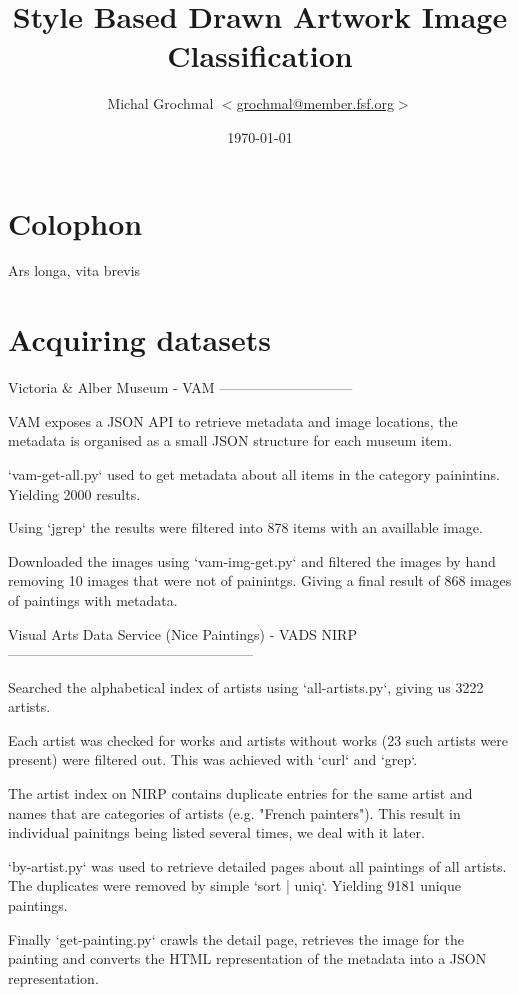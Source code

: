 \documentclass[a4paper,twocolumn]{article}
\title{Style Based Drawn Artwork Image Classification}
\author{Michal Grochmal
  $<$\href{mailto:grochmal@member.fsf.org}{grochmal@member.fsf.org}$>$
}
\date{\today}
\begin{document}
\maketitle

\section{Colophon}

Ars longa, vita brevis \cite{oliphant06numpy}

\section{Acquiring datasets}

Victoria & Alber Museum - VAM
-----------------------------

VAM exposes a JSON API to retrieve metadata and image locations, the metadata
is organised as a small JSON structure for each museum item.

`vam-get-all.py` used to get metadata about all items in the category
painintins.  Yielding 2000 results.

Using `jgrep` the results were filtered into 878 items with an availlable
image.

Downloaded the images using `vam-img-get.py` and filtered the images by hand
removing 10 images that were not of painintgs.  Giving a final result of 868
images of paintings with metadata.

Visual Arts Data Service (Nice Paintings) - VADS NIRP
-----------------------------------------------------

Searched the alphabetical index of artists using `all-artists.py`, giving us
3222 artists.

Each artist was checked for works and artists without works (23 such artists
were present) were filtered out.  This was achieved with `curl` and `grep`.

The artist index on NIRP contains duplicate entries for the same artist and
names that are categories of artists (e.g. "French painters").  This result in
individual painitngs being listed several times, we deal with it later.

`by-artist.py` was used to retrieve detailed pages about all paintings of all
artists.  The duplicates were removed by simple `sort | uniq`.  Yielding 9181
unique paintings.

Finally `get-painting.py` crawls the detail page, retrieves the image for the
painting and converts the HTML representation of the metadata into a JSON
representation.
\end{document}
